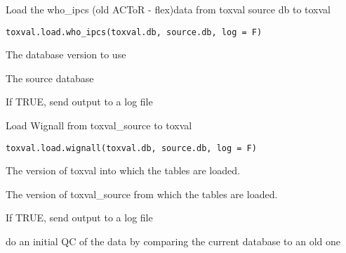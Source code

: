\documentclass[letterpaper]{book}
\begin{document}
%
\begin{Description}\relax
Load the who\_ipcs (old ACToR - flex)data  from toxval source db to toxval
\end{Description}
%
\begin{Usage}
\begin{verbatim}
toxval.load.who_ipcs(toxval.db, source.db, log = F)
\end{verbatim}
\end{Usage}
%
\begin{Arguments}
\begin{ldescription}
\item[\code{toxval.db}] The database version to use

\item[\code{source.db}] The source database

\item[\code{log}] If TRUE, send output to a log file
\end{ldescription}
\end{Arguments}
%
\begin{Description}\relax
Load Wignall from toxval\_source to toxval
\end{Description}
%
\begin{Usage}
\begin{verbatim}
toxval.load.wignall(toxval.db, source.db, log = F)
\end{verbatim}
\end{Usage}
%
\begin{Arguments}
\begin{ldescription}
\item[\code{toxval.db}] The version of toxval into which the tables are loaded.

\item[\code{source.db}] The version of toxval\_source from which the tables are loaded.

\item[\code{log}] If TRUE, send output to a log file
\end{ldescription}
\end{Arguments}
%
\begin{Description}\relax
do an initial QC of the data by comparing the current database to an old one
\end{Description}
\end{document}
